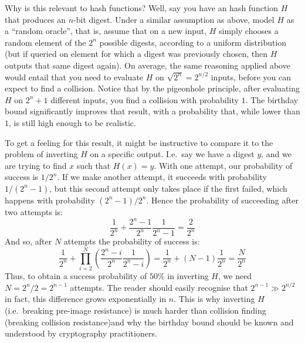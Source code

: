   Why is this relevant to hash functions? Well, say you have an hash function $H$ that produces an $n$-bit digest. Under a similar assumption as above, model $H$ as a ``random oracle'', that is, assume that on a new input, $H$ simply chooses a random element of the $2^n$ possible digests, according to a uniform distribution (but if queried on element for which a digest was previously chosen, then $H$ outputs that same digest again). On average, the same reasoning applied above would entail that you need to evaluate $H$ on $\sqrt{2^n} = 2^{n/2}$ inputs, before you can expect to find a collision. Notice that by the pigeonhole principle, after evaluating $H$ on $2^n+1$ different inputs, you find a collision with probability $1$. The birthday bound significantly improves that result, with a probability that, while lower than $1$, is still high enough to be realistic.

  To get a feeling for this result, it might be instructive to compare it to the problem of inverting $H$ on a specific output. I.e.\ say we have a digest $y$, and we are trying to find $x$ such that $H(x) = y$. With one attempt, our probability of success is $1/2^{n}$. If we make another attempt, it succeeds with probability $1/(2^n-1)$, but this second attempt only takes place if the first failed, which happens with probability $(2^n-1)/2^n$. Hence the probability of succeeding after two attempts is:
  \begin{equation}
    \frac{1}{2^n} + \frac{2^n-1}{2^n}\frac{1}{2^n-1} = \frac{2}{2^{n}}
  \end{equation}
  And so, after $N$ attempts the probability of success is:
  \begin{equation}
    \frac{1}{2^n} + \prod_{i=2}^N\left(\frac{2^n-i}{2^n}\frac{1}{2^n-i}\right) = \frac{1}{2^n} + (N-1) \frac{1}{2^n} = \frac{N}{2^{n}}
  \end{equation}
  Thus, to obtain a success probability of $50\%$ in inverting $H$, we need $N = 2^n/2 = 2^{n-1}$ attempts. The reader should easily recognise that $2^{n-1} \gg 2^{n/2}$\emd in fact, this difference grows exponentially in $n$. This is why inverting $H$ (i.e.\ breaking pre-image resistance) is much harder than collision finding (breaking collision resistance)\emd and why the birthday bound should be known and understood by cryptography practitioners.


